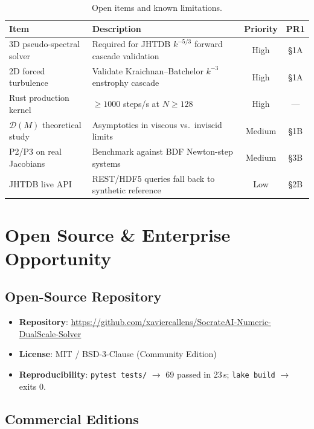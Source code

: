 \documentclass[11pt,a4paper,twoside]{article}
\newcommand{\DM}{\mathcal{D}(M)}
\begin{document}
\begin{table}[H]
\centering
\caption{Open items and known limitations.}
\label{tab:open}
\begin{tabularx}{\textwidth}{lXcc}
\toprule
\textbf{Item} & \textbf{Description} & \textbf{Priority} & \textbf{PR1} \\
\midrule
3D pseudo-spectral solver & Required for JHTDB $k^{-5/3}$ forward cascade validation & High & \S1A \\
2D forced turbulence & Validate Kraichnan--Batchelor $k^{-3}$ enstrophy cascade & High & \S1A \\
Rust production kernel & $\geq 1000$ steps/s at $N \geq 128$ & High & --- \\
$\DM$ theoretical study & Asymptotics in viscous vs.\ inviscid limits & Medium & \S1B \\
P2/P3 on real Jacobians & Benchmark against BDF Newton-step systems & Medium & \S3B \\
JHTDB live API & REST/HDF5 queries fall back to synthetic reference & Low & \S2B \\
\bottomrule
\end{tabularx}
\end{table}

\section{Open Source \& Enterprise Opportunity}
\label{sec:opensource}

\subsection{Open-Source Repository}

\begin{itemize}[leftmargin=*]
\item \textbf{Repository}: \url{https://github.com/xaviercallens/SocrateAI-Numeric-DualScale-Solver}
\item \textbf{License}: MIT / BSD-3-Clause (Community Edition)
\item \textbf{Reproducibility}: \texttt{pytest tests/} $\to$ 69 passed in 23\,s; \texttt{lake build} $\to$ exits 0.
\end{itemize}

\subsection{Commercial Editions}
\end{document}
